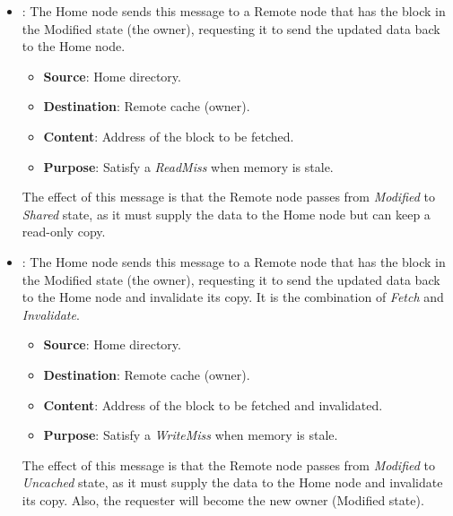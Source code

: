 \begin{itemize}
    \item {}: The Home node sends this message to a Remote node that has the block in the Modified state (the owner), requesting it to send the updated data back to the Home node.
    \begin{itemize}
        \item[\textcolor{Green3}{\faIcon{arrow-right}}] \textcolor{Green3}{\textbf{Source}}: Home directory.
        \item[\textcolor{Green3}{\faIcon{arrow-left}}] \textcolor{Green3}{\textbf{Destination}}: Remote cache (owner).
        \item[\textcolor{Green3}{\faIcon{file-alt}}] \textcolor{Green3}{\textbf{Content}}: Address of the block to be fetched.
        \item[\textcolor{Green3}{\faIcon{question-circle}}] \textcolor{Green3}{\textbf{Purpose}}: Satisfy a \emph{ReadMiss} when memory is stale.
    \end{itemize}
    The effect of this message is that the Remote node passes from \emph{Modified} to \emph{Shared} state, as it must supply the data to the Home node but can keep a read-only copy.


    \item {}: The Home node sends this message to a Remote node that has the block in the Modified state (the owner), requesting it to send the updated data back to the Home node and invalidate its copy. It is the combination of \emph{Fetch} and \emph{Invalidate}.
    \begin{itemize}
        \item[\textcolor{Green3}{\faIcon{arrow-right}}] \textcolor{Green3}{\textbf{Source}}: Home directory.
        \item[\textcolor{Green3}{\faIcon{arrow-left}}] \textcolor{Green3}{\textbf{Destination}}: Remote cache (owner).
        \item[\textcolor{Green3}{\faIcon{file-alt}}] \textcolor{Green3}{\textbf{Content}}: Address of the block to be fetched and invalidated.
        \item[\textcolor{Green3}{\faIcon{question-circle}}] \textcolor{Green3}{\textbf{Purpose}}: Satisfy a \emph{WriteMiss} when memory is stale.
    \end{itemize}
    The effect of this message is that the Remote node passes from \emph{Modified} to \emph{Uncached} state, as it must supply the data to the Home node and invalidate its copy. Also, the requester will become the new owner (Modified state).



\end{itemize}
